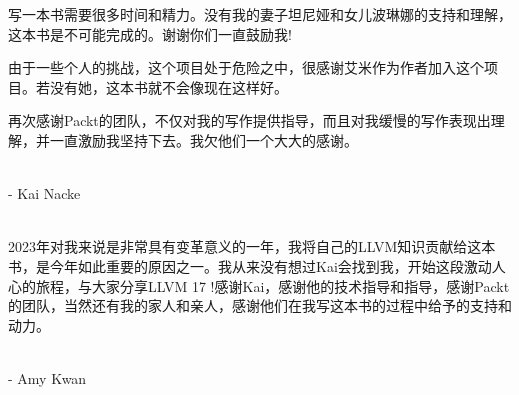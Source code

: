 \begin{center}

写一本书需要很多时间和精力。没有我的妻子坦尼娅和女儿波琳娜的支持和理解，这本书是不可能完成的。谢谢你们一直鼓励我!

由于一些个人的挑战，这个项目处于危险之中，很感谢艾米作为作者加入这个项目。若没有她，这本书就不会像现在这样好。

再次感谢Packt的团队，不仅对我的写作提供指导，而且对我缓慢的写作表现出理解，并一直激励我坚持下去。我欠他们一个大大的感谢。

\hspace*{\fill} \\

- Kai Nacke

\hspace*{\fill} \\

2023年对我来说是非常具有变革意义的一年，我将自己的LLVM知识贡献给这本书，是今年如此重要的原因之一。我从来没有想过Kai会找到我，开始这段激动人心的旅程，与大家分享LLVM 17 !感谢Kai，感谢他的技术指导和指导，感谢Packt的团队，当然还有我的家人和亲人，感谢他们在我写这本书的过程中给予的支持和动力。

\hspace*{\fill} \\

- Amy Kwan

\end{center}